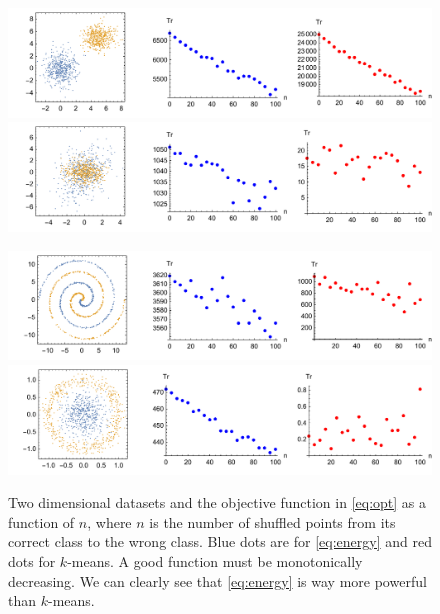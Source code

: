 \documentclass[simplex.tex]{subfiles}
\begin{document}
\begin{figure}[h!]
\begin{cframed}
\centering
\begin{minipage}{0.49\textwidth}
\includegraphics[scale=.37]{../../figs/plot1.pdf}
\includegraphics[scale=.37]{../../figs/plot2.pdf}
\end{minipage}
\begin{minipage}{0.49\textwidth}
\includegraphics[scale=.37]{../../figs/plot3.pdf}
\includegraphics[scale=.37]{../../figs/plot4.pdf}
\end{minipage}
\caption{
Two dimensional datasets and the objective function
in \ref{eq:opt} as a function of $n$, where $n$ is the number of shuffled
points from its correct class to the wrong class. Blue dots
are for \ref{eq:energy} and red dots for $k$-means. A good function must
be monotonically decreasing. We can clearly see that \ref{eq:energy} is
way more powerful than $k$-means.
}
\label{fig:plots}
\end{cframed}
\end{figure}
\clearpage
\end{document}
